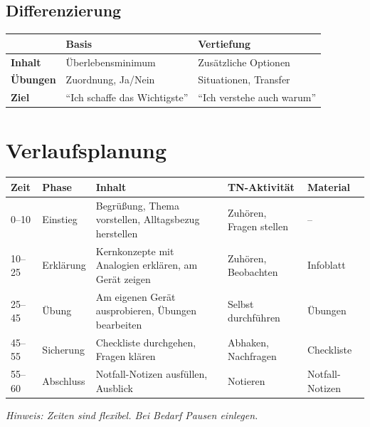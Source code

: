 \documentclass[11pt,a4paper]{article}
\begin{document}
\subsection{Differenzierung}

\begin{tabular}{|l|p{5cm}|p{5cm}|}
\hline
& \textbf{Basis} & \textbf{Vertiefung} \\
\hline
\textbf{Inhalt} & Überlebensminimum & Zusätzliche Optionen \\
\hline
\textbf{Übungen} & Zuordnung, Ja/Nein & Situationen, Transfer \\
\hline
\textbf{Ziel} & ``Ich schaffe das Wichtigste'' & ``Ich verstehe auch warum'' \\
\hline
\end{tabular}

\section{Verlaufsplanung}

\begin{longtable}{|p{1.2cm}|p{2cm}|p{4.5cm}|p{3.5cm}|p{2cm}|}
\hline
\textbf{Zeit} & \textbf{Phase} & \textbf{Inhalt} & \textbf{TN-Aktivität} & \textbf{Material} \\
\hline
\endhead

0--10 & Einstieg & Begrüßung, Thema vorstellen, Alltagsbezug herstellen & Zuhören, Fragen stellen & -- \\
\hline

10--25 & Erklärung & Kernkonzepte mit Analogien erklären, am Gerät zeigen & Zuhören, Beobachten & Infoblatt \\
\hline

25--45 & Übung & Am eigenen Gerät ausprobieren, Übungen bearbeiten & Selbst durchführen & Übungen \\
\hline

45--55 & Sicherung & Checkliste durchgehen, Fragen klären & Abhaken, Nachfragen & Checkliste \\
\hline

55--60 & Abschluss & Notfall-Notizen ausfüllen, Ausblick & Notieren & Notfall-Notizen \\
\hline
\end{longtable}

\textit{Hinweis: Zeiten sind flexibel. Bei Bedarf Pausen einlegen.}
\end{document}
